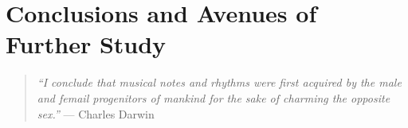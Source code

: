 \chapter{Conclusions and Avenues of Further Study}
\vspace{7mm}

\begin{quote}
  {\sl ``I conclude that musical notes and rhythms were first acquired
    by the male and femail progenitors of mankind for the sake of
    charming the opposite sex.''} --- Charles Darwin
\end{quote}


